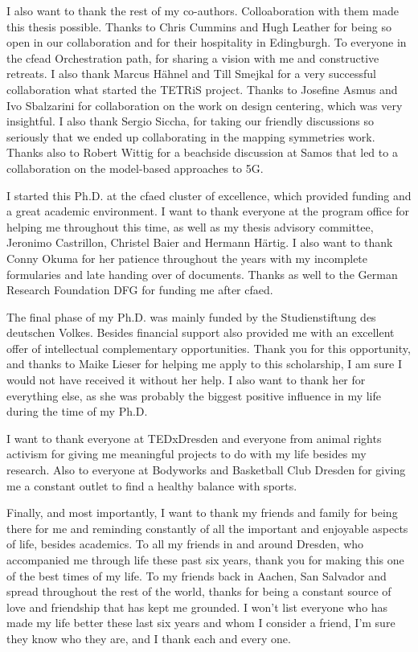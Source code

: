 I also want to thank the rest of my co-authors. Colloaboration with them made this thesis possible.
Thanks to Chris Cummins and Hugh Leather for being so open in our collaboration and for their hospitality in Edingburgh. 
To everyone in the cfead Orchestration path, for sharing a vision with me and constructive retreats.
I also thank Marcus Hähnel and Till Smejkal for a very successful collaboration what started the \acs*{TETRiS} project.
Thanks to Josefine Asmus and Ivo Sbalzarini for collaboration on the work on design centering, which was very insightful.
I also thank Sergio Siccha, for taking our friendly discussions so seriously that we ended up collaborating in the mapping symmetries work.
Thanks also to Robert Wittig for a beachside discussion at Samos that led to a collaboration on the model-based approaches to 5G.

I started this Ph.D. at the \ac{cfaed} cluster of excellence, which provided funding and a great academic environment.
I want to thank everyone at the program office for helping me throughout this time, as well as my thesis advisory committee, Jeronimo Castrillon, Christel Baier and Hermann Härtig.
I also want to thank Conny Okuma for her patience throughout the years with my incomplete formularies and late handing over of documents.
Thanks as well to the German Research Foundation DFG for funding me after \ac{cfaed}.

The final phase of my Ph.D. was mainly funded by the Studienstiftung des deutschen Volkes.
Besides financial support also provided me with an excellent offer of intellectual complementary opportunities.
Thank you for this opportunity, and thanks to Maike Lieser for helping me apply to this scholarship, I am sure I would not have received it without her help.
I also want to thank her for everything else, as she was probably the biggest positive influence in my life during the time of my Ph.D.

I want to thank everyone at TEDxDresden and everyone from animal rights activism for giving me meaningful projects to do with my life besides my research. 
Also to everyone at Bodyworks and Basketball Club Dresden for giving me a constant outlet to find a healthy balance with sports.

Finally, and most importantly, I want to thank my friends and family for being there for me and reminding constantly of all the important and enjoyable aspects of life, besides academics.
To all my friends in and around Dresden, who accompanied me through life these past six years, thank you for making this one of the best times of my life. 
To my friends back in Aachen, San Salvador and spread throughout the rest of the world, thanks for being a constant source of love and friendship that has kept me grounded.
I won't list everyone who has made my life better these last six years and whom I consider a friend, I'm sure they know who they are, and I thank each and every one.

